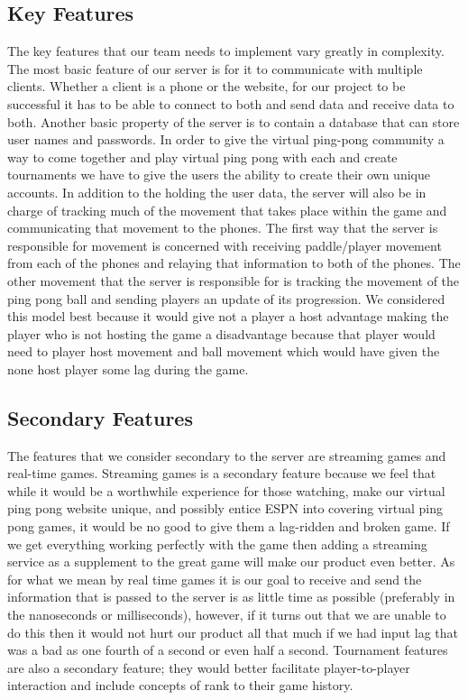 \documentclass[letterpaper,12pt]{article}
\begin{document}
\subsection{Key Features}
	The key features that our team needs to implement vary greatly in complexity.  The most basic feature of our server is for it to communicate with multiple clients.  Whether a client  is a phone or the website, for our project to be successful it has to be able to connect to both and send data and receive data to both.  Another basic property of the server is to contain a database that can store user names and passwords.  In order to give the virtual ping-pong community a way to come together and play virtual ping pong with each and create tournaments we have to give the users the ability to create their own unique accounts.  In addition to the holding the user data, the server will also be in charge of tracking much of the movement that takes place within the game and communicating that movement to the phones.  The first way that the server is responsible for movement is concerned with receiving paddle/player movement from each of the phones and relaying that information to both of the phones.  The other movement that the server is responsible for is tracking the movement of the ping pong ball and sending players an update of its progression.  We considered this model best because it would give not a player a host advantage making the player who is not hosting the game a disadvantage because that player would need to player host movement and ball movement which would have given the none host player some lag during the game.
\subsection{Secondary Features}
	The features that we consider secondary to the server are streaming games and real-time games.  Streaming games is a secondary feature because we feel that while it would be a worthwhile experience for those watching, make our virtual ping pong website unique, and possibly entice ESPN into covering virtual ping pong games, it would be no good to give them a lag-ridden and broken game.  If we get everything working perfectly with the game then adding a streaming service as a supplement to the great game will make our product even better.  As for what we mean by real time games it is our goal to receive and send the information that is passed to the server is as little time as possible (preferably in the nanoseconds or milliseconds), however, if it turns out that we are unable to do this then it would not hurt our product all that much if we had input lag that was a bad as one fourth of a second or even half a second.  Tournament features are also a secondary feature; they would better facilitate player-to-player interaction and include concepts of rank to their game history. 
\end{document}
